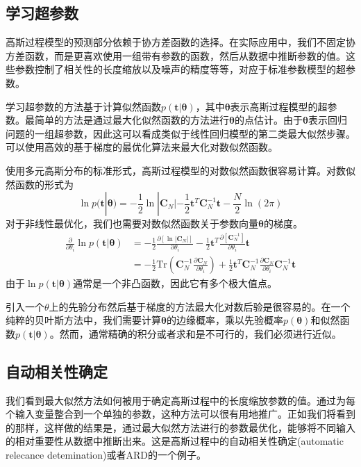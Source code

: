 \subsection*{学习超参数}
高斯过程模型的预测部分依赖于协方差函数的选择。在实际应用中，我们不固定协方差函数，而是更喜欢使用一组带有参数的函数，然后从数据中推断参数的值。这些参数控制了相关性的长度缩放以及噪声的精度等等，对应于标准参数模型的超参数。

学习超参数的方法基于计算似然函数$p(\boldsymbol{t}|\boldsymbol{\theta})$，其中$\boldsymbol{\theta}$表示高斯过程模型的超参数。最简单的方法是通过最大化似然函数的方法进行$\boldsymbol{\theta}$的点估计。由于$\boldsymbol{\theta}$表示回归问题的一组超参数，因此这可以看成类似于线性回归模型的第二类最大似然步骤。可以使用高效的基于梯度的最优化算法来最大化对数似然函数。

使用多元高斯分布的标准形式，高斯过程模型的对数似然函数很容易计算。对数似然函数的形式为
\begin{equation}
	\ln p(\boldsymbol{t}|\boldsymbol{\theta})=-\frac{1}{2}\ln |\boldsymbol{C}_N|-\frac{1}{2}\boldsymbol{t}^T\boldsymbol{C}_N^{-1}\boldsymbol{t}-\frac{N}{2}\ln (2\pi)
\end{equation}
对于非线性最优化，我们也需要对数似然函数关于参数向量$\boldsymbol{\theta}$的梯度。
\begin{equation}
	\begin{aligned}
	\frac{\partial }{\partial \theta_i}\ln p(\boldsymbol{t}|\boldsymbol{\theta})&=-\frac{1}{2}\frac{\partial [\ln |\boldsymbol{C}_N|]}{\partial \theta_i}-\frac{1}{2}\boldsymbol{t}^T\frac{\partial [\boldsymbol{C}_N^{-1}]}{\partial \theta_i}\boldsymbol{t}\\
	&=-\frac{1}{2}\mathrm{Tr}\left(\boldsymbol{C}_N^{-1}\frac{\partial \boldsymbol{C}_N}{\partial \theta_i} \right)+\frac{1}{2}\boldsymbol{t}^T\boldsymbol{C}_N^{-1}\frac{\partial \boldsymbol{C}_N}{\partial \theta_i}\boldsymbol{C}_N^{-1}\boldsymbol{t}
	\end{aligned}
\end{equation}
由于$\ln p(\boldsymbol{t}|\boldsymbol{\theta})$通常是一个非凸函数，因此它有多个极大值点。

引入一个$\theta$上的先验分布然后基于梯度的方法最大化对数后验是很容易的。在一个纯粹的贝叶斯方法中，我们需要计算$\boldsymbol{\theta}$的边缘概率，乘以先验概率$p(\boldsymbol{\theta})$和似然函数$p(\boldsymbol{t}|\boldsymbol{\theta})$。然而，通常精确的积分或者求和是不可行的，我们必须进行近似。
\subsection*{自动相关性确定}
我们看到最大似然方法如何被用于确定高斯过程中的长度缩放参数的值。通过为每个输入变量整合到一个单独的参数，这种方法可以很有用地推广。正如我们将看到的那样，这样做的结果是，通过最大似然方法进行的参数最优化，能够将不同输入的相对重要性从数据中推断出来。这是高斯过程中的自动相关性确定(automatic relecance detemination)或者ARD的一个例子。

